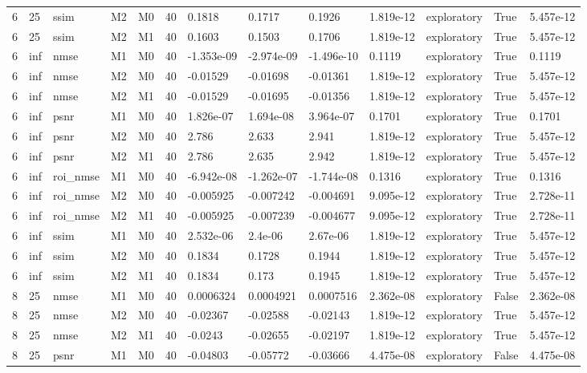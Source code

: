 \begin{tabular}{lllllllllllll}
6 & 25 & ssim & M2 & M0 & 40 & 0.1818 & 0.1717 & 0.1926 & 1.819e-12 & exploratory & True & 5.457e-12 \\
6 & 25 & ssim & M2 & M1 & 40 & 0.1603 & 0.1503 & 0.1706 & 1.819e-12 & exploratory & True & 5.457e-12 \\
6 & inf & nmse & M1 & M0 & 40 & -1.353e-09 & -2.974e-09 & -1.496e-10 & 0.1119 & exploratory & True & 0.1119 \\
6 & inf & nmse & M2 & M0 & 40 & -0.01529 & -0.01698 & -0.01361 & 1.819e-12 & exploratory & True & 5.457e-12 \\
6 & inf & nmse & M2 & M1 & 40 & -0.01529 & -0.01695 & -0.01356 & 1.819e-12 & exploratory & True & 5.457e-12 \\
6 & inf & psnr & M1 & M0 & 40 & 1.826e-07 & 1.694e-08 & 3.964e-07 & 0.1701 & exploratory & True & 0.1701 \\
6 & inf & psnr & M2 & M0 & 40 & 2.786 & 2.633 & 2.941 & 1.819e-12 & exploratory & True & 5.457e-12 \\
6 & inf & psnr & M2 & M1 & 40 & 2.786 & 2.635 & 2.942 & 1.819e-12 & exploratory & True & 5.457e-12 \\
6 & inf & roi\_nmse & M1 & M0 & 40 & -6.942e-08 & -1.262e-07 & -1.744e-08 & 0.1316 & exploratory & True & 0.1316 \\
6 & inf & roi\_nmse & M2 & M0 & 40 & -0.005925 & -0.007242 & -0.004691 & 9.095e-12 & exploratory & True & 2.728e-11 \\
6 & inf & roi\_nmse & M2 & M1 & 40 & -0.005925 & -0.007239 & -0.004677 & 9.095e-12 & exploratory & True & 2.728e-11 \\
6 & inf & ssim & M1 & M0 & 40 & 2.532e-06 & 2.4e-06 & 2.67e-06 & 1.819e-12 & exploratory & True & 5.457e-12 \\
6 & inf & ssim & M2 & M0 & 40 & 0.1834 & 0.1728 & 0.1944 & 1.819e-12 & exploratory & True & 5.457e-12 \\
6 & inf & ssim & M2 & M1 & 40 & 0.1834 & 0.173 & 0.1945 & 1.819e-12 & exploratory & True & 5.457e-12 \\
8 & 25 & nmse & M1 & M0 & 40 & 0.0006324 & 0.0004921 & 0.0007516 & 2.362e-08 & exploratory & False & 2.362e-08 \\
8 & 25 & nmse & M2 & M0 & 40 & -0.02367 & -0.02588 & -0.02143 & 1.819e-12 & exploratory & True & 5.457e-12 \\
8 & 25 & nmse & M2 & M1 & 40 & -0.0243 & -0.02655 & -0.02197 & 1.819e-12 & exploratory & True & 5.457e-12 \\
8 & 25 & psnr & M1 & M0 & 40 & -0.04803 & -0.05772 & -0.03666 & 4.475e-08 & exploratory & False & 4.475e-08 \\

\end{tabular}

